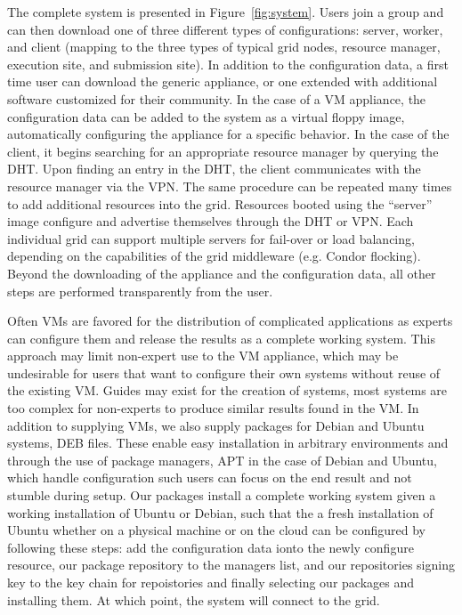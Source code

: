 \documentclass[conference]{IEEEtran}
\begin{document}
The complete system is presented in Figure~\ref{fig:system}.  Users join a
group and can then download one of three different types of configurations:
server, worker, and client (mapping to the three types of typical grid nodes,
resource manager, execution site, and submission site).  In addition to the
configuration data, a first time user can download the generic appliance, or
one extended with additional software customized for their community.  In the
case of a VM appliance, the configuration data can be added to the system as a
virtual floppy image, automatically configuring the appliance for a specific
behavior.  In the case of the client, it begins searching for an appropriate
resource manager by querying the DHT.  Upon finding an entry in the DHT, the
client communicates with the resource manager via the VPN.  The same procedure
can be repeated many times to add additional resources into the grid.
Resources booted using the ``server'' image configure and advertise themselves
through the DHT or VPN.  Each individual grid can support multiple servers for
fail-over or load balancing, depending on the capabilities of the grid
middleware (e.g. Condor flocking).  Beyond the downloading of the appliance and
the configuration data, all other steps are performed transparently from the
user.

Often VMs are favored for the distribution of complicated applications as
experts can configure them and release the results as a complete working
system.  This approach may limit non-expert use to the VM appliance, which may
be undesirable for users that want to configure their own systems without reuse
of the existing VM.  Guides may exist for the creation of systems, most systems
are too complex for non-experts to produce similar results found in the VM.  In
addition to supplying VMs, we also supply packages for Debian and Ubuntu
systems, DEB files.  These enable easy installation in arbitrary environments
and through the use of package managers, APT in the case of Debian and Ubuntu,
which handle configuration such users can focus on the end result and not
stumble during setup.  Our packages install a complete working system given a
working installation of Ubuntu or Debian, such that the a fresh installation of
Ubuntu whether on a physical machine or on the cloud can be configured by
following these steps:  add the configuration data ionto the newly configure
resource, our package repository to the managers list, and our repositories
signing key to the key chain for repoistories and finally selecting our
packages and installing them.  At which point, the system will connect to the
grid.
\end{document}
